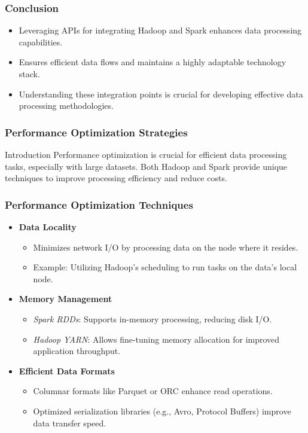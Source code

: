 \documentclass[aspectratio=169]{beamer}
\begin{document}
\begin{frame}[fragile]
    \frametitle{Conclusion}
    \begin{itemize}
        \item Leveraging APIs for integrating Hadoop and Spark enhances data processing capabilities.
        \item Ensures efficient data flows and maintains a highly adaptable technology stack.
        \item Understanding these integration points is crucial for developing effective data processing methodologies.
    \end{itemize}
\end{frame}

\begin{frame}
    \frametitle{Performance Optimization Strategies}
    \begin{block}{Introduction}
        Performance optimization is crucial for efficient data processing tasks, especially with large datasets. Both Hadoop and Spark provide unique techniques to improve processing efficiency and reduce costs.
    \end{block}
\end{frame}

\begin{frame}
    \frametitle{Performance Optimization Techniques}
    \begin{itemize}
        \item \textbf{Data Locality}
        \begin{itemize}
            \item Minimizes network I/O by processing data on the node where it resides.
            \item Example: Utilizing Hadoop's scheduling to run tasks on the data's local node.
        \end{itemize}
        
        \item \textbf{Memory Management}
        \begin{itemize}
            \item \textit{Spark RDDs}: Supports in-memory processing, reducing disk I/O.
            \item \textit{Hadoop YARN}: Allows fine-tuning memory allocation for improved application throughput.
        \end{itemize}
        
        \item \textbf{Efficient Data Formats}
        \begin{itemize}
            \item Columnar formats like Parquet or ORC enhance read operations.
            \item Optimized serialization libraries (e.g., Avro, Protocol Buffers) improve data transfer speed.
        \end{itemize}
    \end{itemize}
\end{frame}
\end{document}
